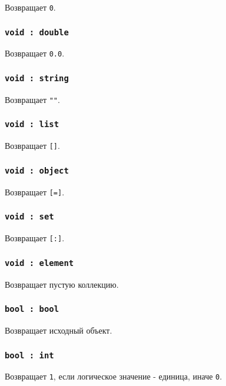 Возвращает \lstinline|0|.

\subsubsection{\lstinline|void : double|}

Возвращает \lstinline|0.0|.

\subsubsection{\lstinline|void : string|}

Возвращает \lstinline|""|.

\subsubsection{\lstinline|void : list|}

Возвращает \lstinline|[]|.

\subsubsection{\lstinline|void : object|}

Возвращает \lstinline|[=]|.

\subsubsection{\lstinline|void : set|}

Возвращает \lstinline|[:]|.

\subsubsection{\lstinline|void : element|}

Возвращает пустую коллекцию.

\subsubsection{\lstinline|bool : bool|}

Возвращает исходный объект.

\subsubsection{\lstinline|bool : int|}

Возвращает \lstinline|1|, если логическое значение - единица, иначе \lstinline|0|.

